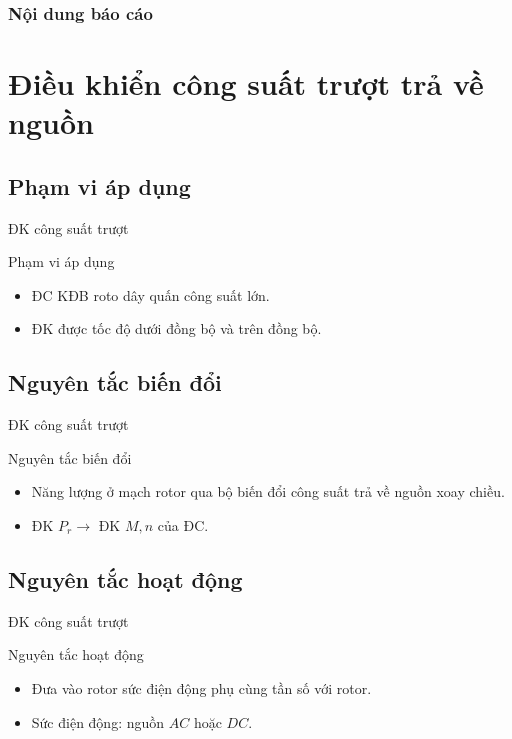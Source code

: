\documentclass[24pt]{beamer}
\begin{document}
\begin	{frame}	%
	\frametitle{Nội dung báo cáo}
	\tableofcontents
\end{frame}
\section[Công suất trượt]{Điều khiển công suất trượt trả về nguồn}
\subsection*{Phạm vi áp dụng}
\begin{frame}{ĐK công suất trượt}
	\begin{block}{Phạm vi áp dụng}
		\begin{itemize}
			\justifying
			\item ĐC KĐB roto dây quấn công suất lớn.
			\item ĐK được tốc độ dưới đồng bộ và trên đồng bộ.
		\end{itemize}				
	\end{block}
\end{frame}

\subsection*{Nguyên tắc biến đổi}
\begin{frame}{ĐK công suất trượt}
\begin{block}{Nguyên tắc biến đổi}
		\begin{itemize}
		\justifying
		\item Năng lượng ở mạch rotor qua bộ biến đổi công suất trả về nguồn xoay chiều.
		\item ĐK $P_r \longrightarrow$ ĐK $M, n$ của ĐC.
		\end{itemize}
	\end{block}
\end{frame}

\subsection*{Nguyên tắc hoạt động}
\begin{frame}{ĐK công suất trượt}
\begin{block}{Nguyên tắc hoạt động}
		\begin{itemize}
		\justifying
		\item Đưa vào rotor sức điện động phụ cùng tần số với rotor.
		\item Sức điện động: nguồn $AC$ hoặc $DC$.
		\end{itemize}
	\end{block}
\end{frame}
\end{document}
